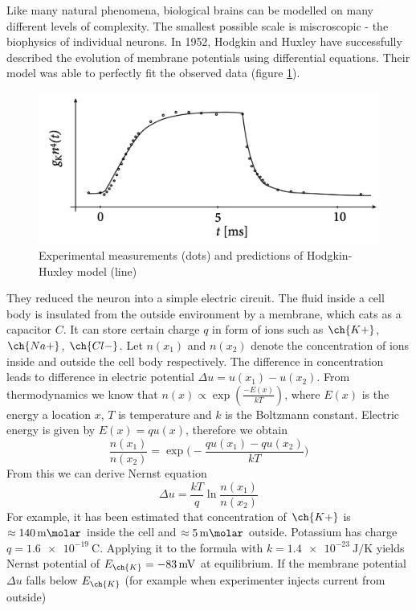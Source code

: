\documentclass[12pt]{article}
\begin{document}
Like many natural phenomena, biological brains can be modelled on many different levels of complexity. The smallest possible scale is miscroscopic - the biophysics of individual neurons. In 1952, Hodgkin and Huxley \cite{hodgkin} have successfully described the evolution of membrane potentials using differential equations. Their model was able to perfectly fit the observed data (figure \ref{fig:hodgkin_huxley_experiments}). 
\begin{figure}[!htbp]
	\centering
	\includegraphics[width=13cm]{hodgkin_huxley_experiments}
	\caption{Experimental measurements (dots) and predictions of Hodgkin-Huxley model  (line) }
	\label{fig:hodgkin_huxley_experiments}
\end{figure} 

They reduced the neuron into a simple electric circuit. The fluid inside a cell body is insulated from the outside environment by a membrane, which cats as a capacitor $C$. It can store certain charge $q$ in form of ions such as $\ch{K+}$, $\ch{Na+}$, $\ch{Cl-}$. Let $n(x_1)$ and $n(x_2)$ denote the concentration of ions inside and outside the cell body respectively. 
The difference in concentration leads to difference in electric potential 
$\Delta u = u(x_1) - u(x_2)$. 
From thermodynamics we know that 
$n(x)\propto \exp(\frac{-E(x)}{kT})$, 
where $E(x)$ is the energy a location $x$, $T$ is temperature and $k$ is the Boltzmann constant. Electric energy is given by $E(x)=qu(x)$, therefore we obtain
\[
\frac{n(x_1)}{n(x_2)} = \exp\big(-\frac{qu(x_1)-qu(x_2)}{kT}\big)
\]
From this we can derive Nernst equation 
\[
\Delta u = \frac{kT}{q}\ln\frac{n(x_1)}{n(x_2)}
\]
For example, it has been estimated that concentration of $\ch{K+}$ is $\approx\SI{140}{\milli\molar}$ inside the cell  and  $\approx\SI{5}{\milli\molar}$ outside. Potassium has charge $q=\SI{1.6e-19}{\coulomb}$. Applying it to the formula with $k=\SI{1.4e-23}{\joule/\kelvin}$ yields Nernst potential of $E_{\ch{K}}=\SI{-83}{\milli\volt}$ at equilibrium. If the membrane potential $\Delta u$ falls below $E_{\ch{K}}$ (for example when experimenter injects current from outside)
\end{document}
